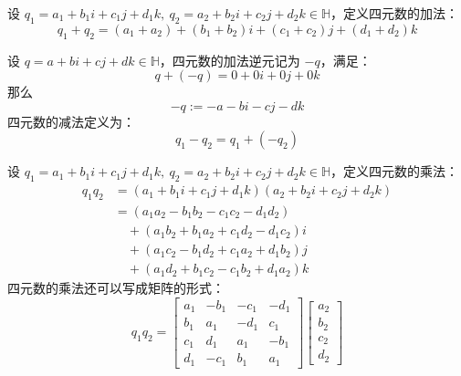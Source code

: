 \begin{definition}[四元数的加法]
    设 $q_1 = a_1 + b_1 i + c_1 j + d_1 k,\ q_2 = a_2 + b_2 i + c_2 j + d_2 k\in\mathbb{H}$，定义四元数的加法：
    \[
        q_1 + q_2 = (a_1 + a_2) + (b_1 + b_2)i + (c_1 + c_2)j + (d_1 + d_2)k
    \]
\end{definition}
\begin{definition}[四元数加法逆元与减法]
    设 $q = a + bi + cj + dk\in\mathbb{H}$，四元数的加法逆元记为 $-q$，满足：
    \[
        q + (-q) = 0 + 0i + 0j + 0k
    \]
    那么
    \[
        -q := -a - bi - cj - dk
    \]
    四元数的减法定义为：
    \[
        q_1 - q_2 = q_1 + (-q_2)
    \]
\end{definition}
\vspace{1em}

\begin{definition}[四元数的乘法]
    设 $q_1 = a_1 + b_1 i + c_1 j + d_1 k,\ q_2 = a_2 + b_2 i + c_2 j + d_2 k\in\mathbb{H}$，定义四元数的乘法：
    \begin{align*}
        q_1 q_2 &= (a_1 + b_1 i + c_1 j + d_1 k)(a_2 + b_2 i + c_2 j + d_2 k) \\
        &= (a_1 a_2 - b_1 b_2 - c_1 c_2 - d_1 d_2) \\
        &\quad + (a_1 b_2 + b_1 a_2 + c_1 d_2 - d_1 c_2)i \\
        &\quad + (a_1 c_2 - b_1 d_2 + c_1 a_2 + d_1 b_2)j \\
        &\quad + (a_1 d_2 + b_1 c_2 - c_1 b_2 + d_1 a_2)k
    \end{align*}
    四元数的乘法还可以写成矩阵的形式：
    \[
        q_1 q_2 = 
        \begin{bmatrix}
            a_1 & -b_1 & -c_1 & -d_1 \\
            b_1 & a_1 & -d_1 & c_1 \\
            c_1 & d_1 & a_1 & -b_1 \\
            d_1 & -c_1 & b_1 & a_1
        \end{bmatrix}
        \begin{bmatrix}
            a_2 \\ b_2 \\ c_2 \\ d_2

\end{bmatrix}\]
\end{definition}
